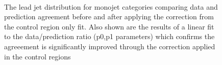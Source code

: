 \begin{figure}[tbhp]
    \begin{center}
         ~~
        \\
        \caption{The lead jet \pt distribution for monojet categories comparing data and prediction agreement before and after applying the correction from the control region only fit. Also shown are the results of a linear fit to the data/prediction ratio (p0,p1 parameters) which confirms the agreeement is significantly improved through the correction applied in the control regions}
    \end{center}
\end{figure}
